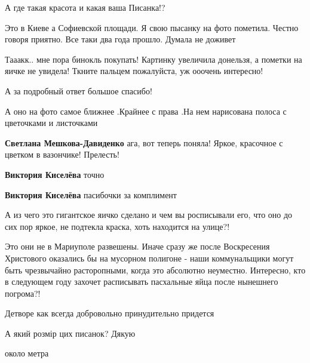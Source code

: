 
 
 
 
 

\qqSecCmt


А где такая красота и какая ваша Писанка!?

\begin{itemize} %

Это в Киеве а Софиевской площади. Я свою пысанку на фото пометила. Честно
говоря приятно. Все таки два года прошло. Думала не доживет
\end{itemize} %


Тааакк.. мне пора бинокль покупать! Картинку увеличила донельзя, а пометки на
яичке не увидела! Ткните пальцем пожалуйста, уж ооочень интересно!

А за подробный ответ большое спасибо!

\begin{itemize} %

А оно на фото самое ближнее .Крайнее с права .На нем нарисована полоса с цветочками и листочками

\textbf{Светлана Мешкова-Давиденко} ага, вот теперь поняла! Яркое, красочное с цветком в вазончике! Прелесть!

\textbf{Виктория Киселёва} точно

\textbf{Виктория Киселёва} пасибочки за комплимент


А из чего это гигантское яичко сделано и чем вы росписывали его, что оно до сих
пор яркое, не подтекла краска, хоть находится на улице?!

\end{itemize} %


Это они не в Мариуполе развешены. Иначе сразу же после Воскресения Христового
оказались бы на мусорном полигоне - наши коммунальщики могут быть чрезвычайно
расторопными, когда это абсолютно неуместно. Интересно, кто в следующем году
захочет расписывать пасхальные яйца после нынешнего погрома?!

\begin{itemize} %

Детворе как всегда добровольно принудительно придется
\end{itemize} %


А який розмір цих писанок? Дякую

\begin{itemize} %
около метра
\end{itemize} %
